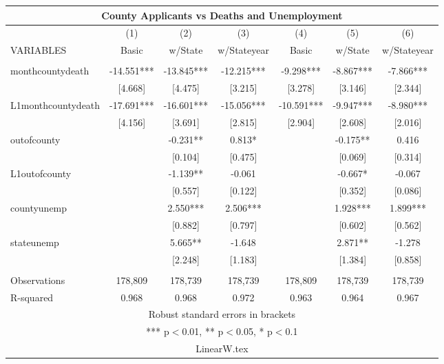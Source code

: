 \documentclass[]{article}
\begin{document}
\begin{tabular}{lcccccc}
\multicolumn{7}{c}{County Applicants vs Deaths and Unemployment} \\ \hline
 & (1) & (2) & (3) & (4) & (5) & (6) \\
VARIABLES & Basic & w/State & w/Stateyear & Basic & w/State & w/Stateyear \\ \hline
 &  &  &  &  &  &  \\
monthcountydeath & -14.551*** & -13.845*** & -12.215*** & -9.298*** & -8.867*** & -7.866*** \\
 & [4.668] & [4.475] & [3.215] & [3.278] & [3.146] & [2.344] \\
L1monthcountydeath & -17.691*** & -16.601*** & -15.056*** & -10.591*** & -9.947*** & -8.980*** \\
 & [4.156] & [3.691] & [2.815] & [2.904] & [2.608] & [2.016] \\
outofcounty &  & -0.231** & 0.813* &  & -0.175** & 0.416 \\
 &  & [0.104] & [0.475] &  & [0.069] & [0.314] \\
L1outofcounty &  & -1.139** & -0.061 &  & -0.667* & -0.067 \\
 &  & [0.557] & [0.122] &  & [0.352] & [0.086] \\
countyunemp &  & 2.550*** & 2.506*** &  & 1.928*** & 1.899*** \\
 &  & [0.882] & [0.797] &  & [0.602] & [0.562] \\
stateunemp &  & 5.665** & -1.648 &  & 2.871** & -1.278 \\
 &  & [2.248] & [1.183] &  & [1.384] & [0.858] \\
 &  &  &  &  &  &  \\
Observations & 178,809 & 178,739 & 178,739 & 178,809 & 178,739 & 178,739 \\
 R-squared & 0.968 & 0.968 & 0.972 & 0.963 & 0.964 & 0.967 \\ \hline
\multicolumn{7}{c}{ Robust standard errors in brackets} \\
\multicolumn{7}{c}{ *** p$<$0.01, ** p$<$0.05, * p$<$0.1} \\
\multicolumn{7}{c}{ LinearW.tex} \\
\end{tabular}
\end{document}
